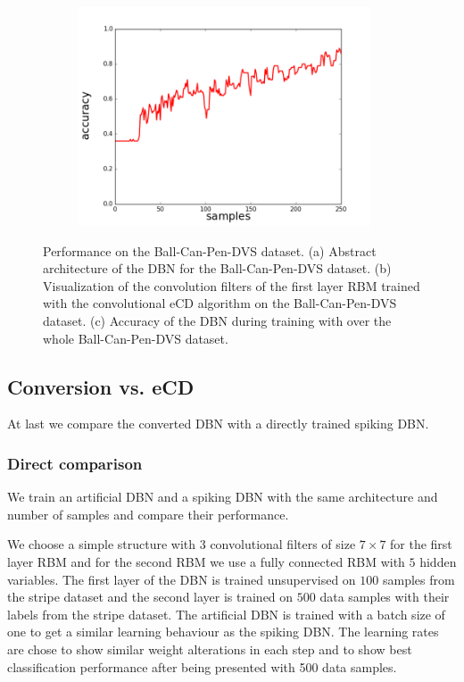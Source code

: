 \begin{figure}[h!]
\begin{subfigure}{.32\textwidth}
    	\includegraphics[width=0.95\textwidth]{imgs/bcp/acc.png} 
    \caption{}
	\label{fig:bcpacc}
	\end{subfigure}%
	\caption[Performance on the Ball-Can-Pen-DVS dataset.]{Performance on the Ball-Can-Pen-DVS dataset. (a) Abstract architecture of the DBN for the Ball-Can-Pen-DVS dataset. (b) Visualization of the convolution filters of the first layer RBM trained with the convolutional eCD algorithm on the Ball-Can-Pen-DVS dataset. (c) Accuracy of the DBN during training with over the whole Ball-Can-Pen-DVS dataset.}
\end{figure}

\subsection{Conversion vs. eCD} \label{c:comparisonexp}

At last we compare the converted DBN with a directly trained spiking DBN.

\subsubsection{Direct comparison}

We train an artificial DBN and a spiking DBN with the same architecture and number of samples and compare their performance.

We choose a simple structure with $3$ convolutional filters of size $7 \times 7$ for the first layer RBM and for the second RBM we use a fully connected RBM with $5$ hidden variables.
The first layer of the DBN is trained unsupervised on $100$ samples from the stripe dataset and the second layer is trained on $500$ data samples with their labels from the stripe dataset.
The artificial DBN is trained with a batch size of one to get a similar learning behaviour as the spiking DBN. 
The learning rates are chose to show similar weight alterations in each step and to show best classification performance after being presented with 500 data samples.


